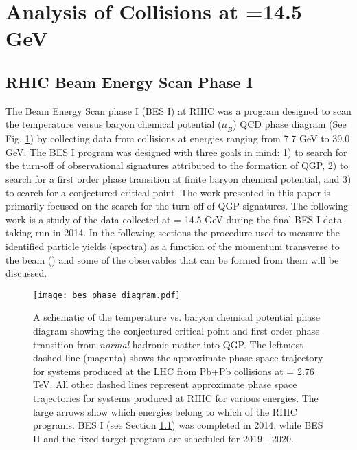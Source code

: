 \section{Analysis of \texorpdfstring{\auau}{AuAu} Collisions at \texorpdfstring{\snn}{sqrt(sNN)}=14.5 GeV }
\label{sec:analysis}
	\subsection{RHIC Beam Energy Scan Phase I }
	\label{sec:besi}
	The Beam Energy Scan phase I (BES I) at RHIC was a program designed to scan the temperature versus baryon chemical potential ($\mu_B$) QCD phase diagram (See Fig. \ref{fig:qcd_phase_diagram}) by collecting data from \auau collisions at \snn energies ranging from 7.7 GeV to 39.0 GeV. The BES I program was designed with three goals in mind: 1) to search for the turn-off of observational signatures attributed to the formation of QGP, 2) to search for a first order phase transition at finite baryon chemical potential, and 3) to search for a conjectured critical point. The work presented in this paper is primarily focused on the search for the turn-off of QGP signatures. The following work is a study of the \auau data collected at \snn = 14.5 GeV during the final BES I data-taking run in 2014. In the following sections the procedure used to measure the identified particle yields (spectra) as a function of the momentum transverse to the beam (\pt) and some of the observables that can be formed from them will be discussed.

	\begin{figure}
		\centering 
		\texttt{[image: bes\_phase\_diagram.pdf]} 
		
		\caption{ \label{fig:qcd_phase_diagram}  A schematic of the temperature vs. baryon chemical potential phase diagram showing the conjectured critical point and first order phase transition from \textit{normal} hadronic matter into QGP\cite{bicudo_chiral_2011}. The leftmost dashed line (magenta) shows the approximate phase space trajectory for systems produced at the LHC from Pb+Pb collisions at \snn = 2.76 TeV. All other dashed lines represent approximate phase space trajectories for systems produced at RHIC for various \snn energies. The large arrows show which energies belong to which of the RHIC programs. BES I (see Section \ref{sec:besi}) was completed in 2014, while BES II and the fixed target program are scheduled for 2019 - 2020. } 
	\end{figure}


